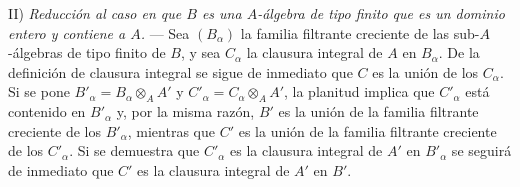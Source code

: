 II) \emph{Reducción al caso en que $B$ es una $A$-álgebra de tipo
finito que es un dominio entero y contiene a $A$.} --- Sea
$(B_\alpha)$ la familia filtrante creciente de las sub-$A$-álgebras
de tipo finito de $B$, y sea $C_\alpha$ la clausura
integral de $A$ en $B_\alpha$. De la definición de clausura integral se sigue de
inmediato que $C$ es la unión de los $C_\alpha$. Si se pone
$B'_\alpha=B_\alpha\otimes_A A'$ y
$C'_\alpha=C_\alpha\otimes_A A'$, la planitud implica que
$C'_\alpha$ está contenido en $B'_\alpha$ y, por la misma razón,
$B'$ es la unión de la familia filtrante creciente de los
$B'_\alpha$, mientras que $C'$ es la unión de la familia filtrante
creciente de los $C'_\alpha$. Si se demuestra que $C'_\alpha$ es la
clausura integral de $A'$ en $B'_\alpha$ se seguirá de inmediato
que $C'$ es la clausura integral de $A'$ en $B'$.
